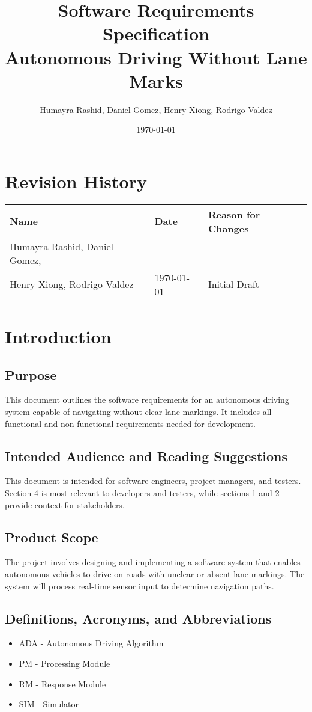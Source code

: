 \documentclass[12pt]{article}
\title{Software Requirements Specification\\\vspace{0.3em}\large Autonomous Driving Without Lane Marks}
\author{Humayra Rashid, Daniel Gomez, Henry Xiong, Rodrigo Valdez}
\date{\today}
\begin{document}
\maketitle

\section*{Revision History}
\begin{tabular}{|l|l|l|}
\hline
\textbf{Name} & \textbf{Date} & \textbf{Reason for Changes} \\
\hline
Humayra Rashid, Daniel Gomez,\\ Henry Xiong, Rodrigo Valdez & \today & Initial Draft \\
\hline
\end{tabular}

\newpage

\section{Introduction}
\subsection{Purpose}
This document outlines the software requirements for an autonomous driving system capable of navigating without clear lane markings. It includes all functional and non-functional requirements needed for development.

\subsection{Intended Audience and Reading Suggestions}
This document is intended for software engineers, project managers, and testers. Section 4 is most relevant to developers and testers, while sections 1 and 2 provide context for stakeholders.

\subsection{Product Scope}
The project involves designing and implementing a software system that enables autonomous vehicles to drive on roads with unclear or absent lane markings. The system will process real-time sensor input to determine navigation paths.

\subsection{Definitions, Acronyms, and Abbreviations}
\begin{itemize}[noitemsep]
  \item ADA - Autonomous Driving Algorithm
  \item PM - Processing Module
  \item RM - Response Module
  \item SIM - Simulator
\end{itemize}
\end{document}
